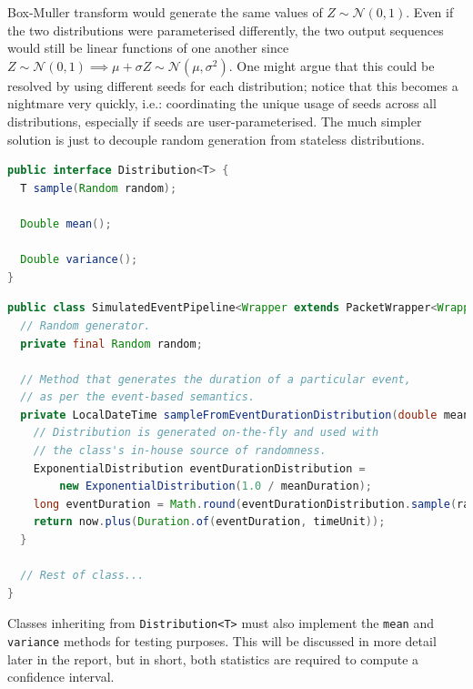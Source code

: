 \begin{itemize}
    Box-Muller transform would generate the same values of $Z \sim \mathcal{N}(0,1)$\cite{box_muller_transform}. Even
    if the two distributions were parameterised differently, the two output sequences would still be linear functions
    of one another since $Z \sim \mathcal{N}(0,1) \implies \mu + \sigma Z \sim \mathcal{N}(\mu, \sigma^2)$. One might
    argue that this could be resolved by using different seeds for each distribution; notice that this becomes a
    nightmare very quickly, i.e.: coordinating the unique usage of seeds across all distributions, especially if
    seeds are user-parameterised. The much simpler solution is just to decouple random generation from
    stateless distributions.
\end{itemize}

\begin{lstlisting}[language=Java,caption={The \texttt{Distribution<T>} interface exactly as it appears in the
codebase.},label={code:distribution_inferface},captionpos=b]
public interface Distribution<T> {
  T sample(Random random);

  Double mean();

  Double variance();
}
\end{lstlisting}

\begin{lstlisting}[language=Java,caption={An example of a distribution being created and sampled on-the-fly with
arbitrary parameters.},label={code:sample_from_event_duration_distribution},captionpos=b]
public class SimulatedEventPipeline<Wrapper extends PacketWrapper<Wrapper>> implements PacketFilter<Wrapper> {
  // Random generator.
  private final Random random;

  // Method that generates the duration of a particular event,
  // as per the event-based semantics.
  private LocalDateTime sampleFromEventDurationDistribution(double meanDuration) {
    // Distribution is generated on-the-fly and used with
    // the class's in-house source of randomness.
    ExponentialDistribution eventDurationDistribution =
        new ExponentialDistribution(1.0 / meanDuration);
    long eventDuration = Math.round(eventDurationDistribution.sample(random));
    return now.plus(Duration.of(eventDuration, timeUnit));
  }

  // Rest of class...
}
\end{lstlisting}

Classes inheriting from \texttt{Distribution<T>} must also implement the \texttt{mean} and \texttt{variance} methods
for testing purposes. This will be discussed in more detail later in the report, but in short, both statistics are
required to compute a confidence interval\cite{confidence_interval}.


